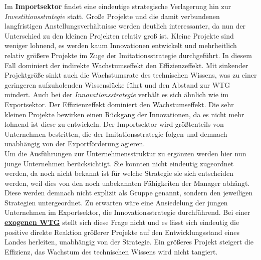 Im \textbf{Importsektor} findet eine eindeutige strategische Verlagerung hin zur \textit{Investitionsstrategie} statt. Große Projekte und die damit verbundenen langfristigen Anstellungsverhältnisse werden deutlich interessanter, da nun der Unterschied zu den kleinen Projekten relativ groß ist. Kleine Projekte sind weniger lohnend, es werden kaum Innovationen entwickelt und mehrheitlich relativ größere Projekte im Zuge der Imitationsstrategie durchgeführt. In diesem Fall dominiert der indirekte Wachstumseffekt den Effizienzeffekt. Mit sinkender Projektgröße sinkt auch die Wachstumsrate des technischen Wissens, was zu einer geringeren aufzuholenden Wissenslücke führt und den Abstand zur WTG mindert. Auch bei der \textit{Innovationsstrategie} verhält es sich ähnlich wie im Exportsektor. Der Effizienzeffekt dominiert den Wachstumseffekt. Die sehr kleinen Projekte bewirken einen Rückgang der Innovationen, da es nicht mehr lohnend ist diese zu entwickeln. Der Importsektor wird größtenteils von Unternehmen bestritten, die der Imitationsstrategie folgen und demnach unabhängig von der Exportförderung agieren. \\
%
Um die Ausführungen zur Unternehmensstruktur zu ergänzen werden hier nun junge Unternehmen berücksichtigt. Sie konnten nicht eindeutig zugeordnet werden, da noch nicht bekannt ist für welche Strategie sie sich entscheiden werden, weil dies von den noch unbekannten Fähigkeiten der Manager abhängt. Diese werden demnach nicht explizit als Gruppe genannt, sondern den jeweiligen Strategien untergeordnet. Zu erwarten wäre eine Ansiedelung der jungen Unternehmen im Exportsektor, die Innovationsstrategie durchführend. 
Bei einer \textbf{\uline{exogenen WTG}} stellt sich diese Frage nicht und es lässt sich eindeutig die positive direkte Reaktion größerer Projekte auf den Entwicklungsstand eines Landes herleiten, unabhängig von der Strategie. Ein größeres Projekt steigert die Effizienz, das Wachstum des technischen Wissens wird nicht tangiert. 
%

